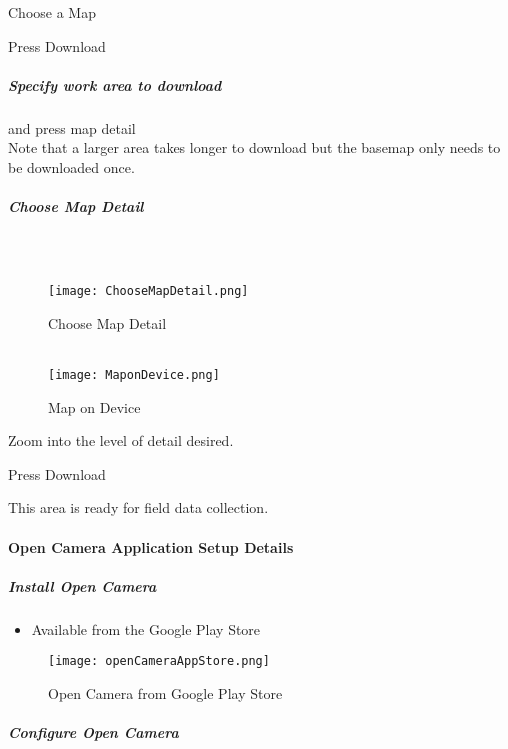 \documentclass[class=article , crop=false, titlepage, twoside, multi={itemize, figure, verbatim}, float=false]{standalone}
\begin{document}
\noindent \large Choose a Map
\vspace{.35in}

\noindent Press \Large Download

\clearpage
\subparagraph{Specify work area to download}and press \Large map detail\\
\noindent \footnotesize Note that a larger area takes longer to download but the basemap only needs to be downloaded once.
\subparagraph{Choose Map Detail}

\subparagraph*{\texorpdfstring{\\}{}}
\begin{wrapfigure}{r}{0.5\textwidth}
\centering
\texttt{[image: ChooseMapDetail.png]}
\caption{Choose Map Detail}
\vspace{.25in}
\HRule \\[.4cm] %
\vspace{.25in}
\texttt{[image: MaponDevice.png]}
\caption{Map on Device}
\end{wrapfigure}
Zoom into the level of detail desired.
\vspace{.5in}

\noindent Press Download
\vspace{3.5in}

\noindent This area is ready for field data collection.

\clearpage
\paragraph{Open Camera Application Setup Details}

\subparagraph{Install Open Camera}
\begin{itemize}
\item Available from the Google Play Store
\end{itemize}
\begin{figure}[h!]
\centering
    \texttt{[image: openCameraAppStore.png]}
\caption{Open Camera from Google Play Store}
\end{figure}

\clearpage
\subparagraph{Configure Open Camera}
\end{document}
